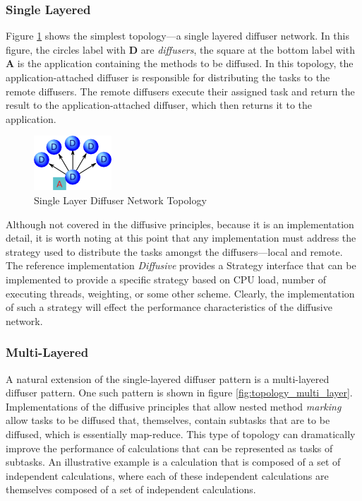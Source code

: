 \documentclass[11pt]{scrartcl}
\begin{document}
\subsubsection{Single Layered}
Figure \ref{fig:topology_single_layer} shows the simplest topology---a single layered diffuser network. In this figure, the circles label with \textbf{D} are \emph{diffusers}, the square at the bottom label with \textbf{A} is the application containing the methods to be diffused. In this topology, the application-attached diffuser is responsible for distributing the tasks to the remote diffusers. The remote diffusers execute their assigned task and return the result to the application-attached diffuser, which then returns it to the application.

\begin{figure}[htbp]
\begin{center}
\includegraphics[scale=1.0]{topology_single_layer}
\caption{Single Layer Diffuser Network Topology\label{fig:topology_single_layer}}
\end{center}
\end{figure}

Although not covered in the diffusive principles, because it is an implementation detail, it is worth noting at this point that any implementation must address the strategy used to distribute the tasks amongst the diffusers---local and remote. The reference implementation \emph{Diffusive} provides a \textsf{Strategy} interface that can be implemented to provide a specific strategy based on CPU load, number of executing threads, weighting, or some other scheme. Clearly, the implementation of such a strategy will effect the performance characteristics of the diffusive network.

\subsubsection{Multi-Layered}
A natural extension of the single-layered diffuser pattern is a multi-layered diffuser pattern. One such pattern is  shown in figure \ref{fig:topology_multi_layer}. Implementations of the diffusive principles that allow nested method \emph{marking} allow tasks to be diffused that, themselves, contain subtasks that are to be diffused, which is essentially map-reduce. This type of topology can dramatically improve the performance of calculations that can be represented as tasks of subtasks. An illustrative example is a calculation that is composed of a set of independent calculations, where each of these independent calculations are themselves composed of a set of independent calculations. 
\end{document}

